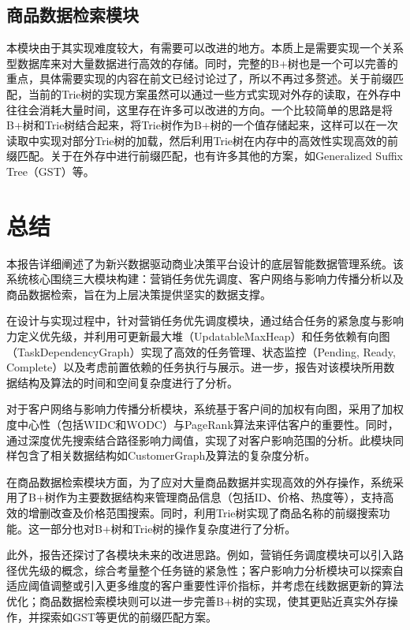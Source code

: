 \documentclass[cn,hazy,blue,10pt,normal]{elegantnote}
\begin{document}
\subsection{商品数据检索模块}

本模块由于其实现难度较大，有需要可以改进的地方。本质上是需要实现一个关系型数据库来对大量数据进行高效的存储。同时，完整的B+树也是一个可以完善的重点，具体需要实现的内容在前文已经讨论过了，所以不再过多赘述。关于前缀匹配，当前的Trie树的实现方案虽然可以通过一些方式实现对外存的读取，在外存中往往会消耗大量时间，这里存在许多可以改进的方向。一个比较简单的思路是将B+树和Trie树结合起来，将Trie树作为B+树的一个值存储起来，这样可以在一次读取中实现对部分Trie树的加载，然后利用Trie树在内存中的高效性实现高效的前缀匹配。关于在外存中进行前缀匹配，也有许多其他的方案，如Generalized Suffix Tree（GST）等。

\section{总结}
本报告详细阐述了为新兴数据驱动商业决策平台设计的底层智能数据管理系统。该系统核心围绕三大模块构建：营销任务优先调度、客户网络与影响力传播分析以及商品数据检索，旨在为上层决策提供坚实的数据支撑。

在设计与实现过程中，针对营销任务优先调度模块，通过结合任务的紧急度与影响力定义优先级，并利用可更新最大堆（UpdatableMaxHeap）和任务依赖有向图（TaskDependencyGraph）实现了高效的任务管理、状态监控（Pending, Ready, Complete）以及考虑前置依赖的任务执行与展示。进一步，报告对该模块所用数据结构及算法的时间和空间复杂度进行了分析。

对于客户网络与影响力传播分析模块，系统基于客户间的加权有向图，采用了加权度中心性（包括WIDC和WODC）与PageRank算法来评估客户的重要性。同时，通过深度优先搜索结合路径影响力阈值，实现了对客户影响范围的分析。此模块同样包含了相关数据结构如CustomerGraph及算法的复杂度分析。

在商品数据检索模块方面，为了应对大量商品数据并实现高效的外存操作，系统采用了B+树作为主要数据结构来管理商品信息（包括ID、价格、热度等），支持高效的增删改查及价格范围搜索。同时，利用Trie树实现了商品名称的前缀搜索功能。这一部分也对B+树和Trie树的操作复杂度进行了分析。

此外，报告还探讨了各模块未来的改进思路。例如，营销任务调度模块可以引入路径优先级的概念，综合考量整个任务链的紧急性；客户影响力分析模块可以探索自适应阈值调整或引入更多维度的客户重要性评价指标，并考虑在线数据更新的算法优化；商品数据检索模块则可以进一步完善B+树的实现，使其更贴近真实外存操作，并探索如GST等更优的前缀匹配方案。
\end{document}
